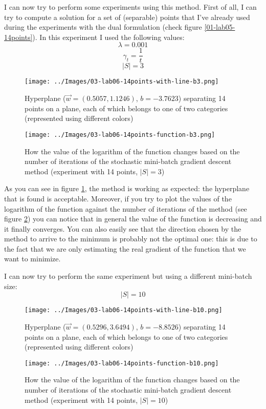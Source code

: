     I can now try to perform some experiments using this method. First of all, I can try to compute a solution for a set of (separable) points that I've already used during the experiments with the dual formulation (check figure \ref{01-lab05-14points}). In this experiment I used the following values:
    \[\lambda = 0.001\]
    \[\gamma_t = \frac{1}{t}\]
    \[|S| = 3\]
    \begin{figure}
        \centering
        \texttt{[image: ../Images/03-lab06-14points-with-line-b3.png]}
        \caption{Hyperplane (\(\vec{w} = (0.5057, 1.1246)\), \(b=-3.7623\)) separating 14 points on a plane, each of which belongs to one of two categories (represented using different colors)}
        \label{03-lab06-14points-with-line-b3}
    \end{figure}
    \begin{figure}
        \centering
        \texttt{[image: ../Images/03-lab06-14points-function-b3.png]}
        \caption{How the value of the logarithm of the function changes based on the number of iterations of the stochastic mini-batch gradient descent method (experiment with 14 points, \(|S| = 3\))}
        \label{03-lab06-14points-function-b3}
    \end{figure}
    As you can see in figure \ref{03-lab06-14points-with-line-b3}, the method is working as expected: the hyperplane that is found is acceptable. Moreover, if you try to plot the values of the logarithm of the function against the number of iterations of the method (see figure \ref{03-lab06-14points-function-b3}) you can notice that in general the value of the function is decreasing and it finally converges. You can also easily see that the direction chosen by the method to arrive to the minimum is probably not the optimal one: this is due to the fact that we are only estimating the real gradient of the function that we want to minimize.\par
    I can now try to perform the same experiment but using a different mini-batch size:
    \[|S| = 10\]
    \begin{figure}
        \centering
        \texttt{[image: ../Images/03-lab06-14points-with-line-b10.png]}
        \caption{Hyperplane (\(\vec{w} = (0.5296, 3.6494)\), \(b=-8.8526\)) separating 14 points on a plane, each of which belongs to one of two categories (represented using different colors)}
        \label{03-lab06-14points-with-line-b10}
    \end{figure}
    \begin{figure}
        \centering
        \texttt{[image: ../Images/03-lab06-14points-function-b10.png]}
        \caption{How the value of the logarithm of the function changes based on the number of iterations of the stochastic mini-batch gradient descent method (experiment with 14 points, \(|S| = 10\))}
        \label{03-lab06-14points-function-b10}
    \end{figure}
